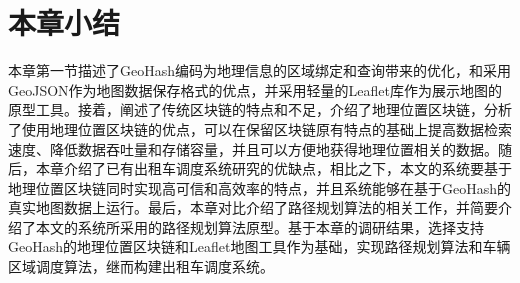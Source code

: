 \section{本章小结}
本章第一节描述了GeoHash编码为地理信息的区域绑定和查询带来的优化，和采用GeoJSON作为地图数据保存格式的优点，并采用轻量的Leaflet库作为展示地图的原型工具。接着，阐述了传统区块链的特点和不足，介绍了地理位置区块链，分析了使用地理位置区块链的优点，可以在保留区块链原有特点的基础上提高数据检索速度、降低数据吞吐量和存储容量，并且可以方便地获得地理位置相关的数据。随后，本章介绍了已有出租车调度系统研究的优缺点，相比之下，本文的系统要基于地理位置区块链同时实现高可信和高效率的特点，并且系统能够在基于GeoHash的真实地图数据上运行。最后，本章对比介绍了路径规划算法的相关工作，并简要介绍了本文的系统所采用的路径规划算法原型。基于本章的调研结果，选择支持GeoHash的地理位置区块链和Leaflet地图工具作为基础，实现路径规划算法和车辆区域调度算法，继而构建出租车调度系统。